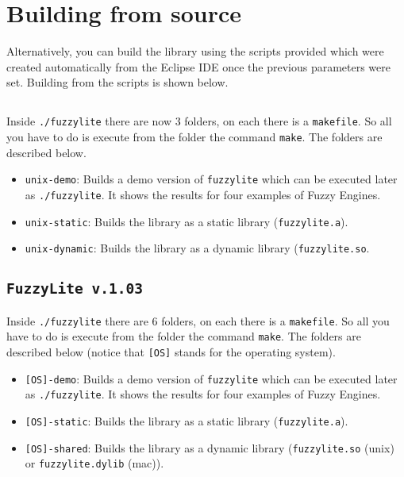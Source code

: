 \section{Building from source}

Alternatively, you can build the library using the scripts provided which were created automatically from the Eclipse IDE once the previous parameters were set. Building from the scripts is shown below.

\subsection{\fl}
Inside \texttt{./fuzzylite} there are now 3 folders, on each there is a
	\texttt{makefile}. So all you have to do is execute from the folder the
	command \texttt{make}. The folders are described below.
	\begin{itemize}	
	  \item \texttt{unix-demo}: Builds a demo version of \texttt{fuzzylite} which
	  can be executed later as \texttt{./fuzzylite}. It shows the results for four
	  examples of Fuzzy Engines.
	  \item \texttt{unix-static}: Builds the library as a static library
	  (\texttt{fuzzylite.a}).
	  \item \texttt{unix-dynamic}: Builds the library as a dynamic library
	  (\texttt{fuzzylite.so}.
\end{itemize}

\subsection{\texttt{FuzzyLite v.1.03}}
	Inside \texttt{./fuzzylite} there are 6 folders, on each there is a
	\texttt{makefile}. So all you have to do is execute from the folder the
	command \texttt{make}. The folders are described below (notice that
	\texttt{[OS]} stands for the operating system).
	\begin{itemize}	
	  \item \texttt{[OS]-demo}: Builds a demo version of \texttt{fuzzylite} which
	  can be executed later as \texttt{./fuzzylite}. It shows the results for four
	  examples of Fuzzy Engines.
	  \item \texttt{[OS]-static}: Builds the library as a static library
	  (\texttt{fuzzylite.a}).
	  \item \texttt{[OS]-shared}: Builds the library as a dynamic library
	  (\texttt{fuzzylite.so} (unix) or \texttt{fuzzylite.dylib} (mac)).
\end{itemize}

